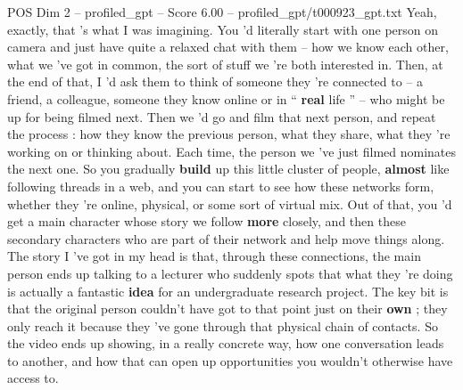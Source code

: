 \begin{textsample}{POS Dim 2 – profiled\_gpt – Score 6.00 – profiled\_gpt/t000923\_gpt.txt}  \label{ex:f2_pos_011}
Yeah, exactly, that ’s what I was imagining.
You ’d literally start with one person on camera and just have quite a relaxed chat with them – how we know each other, what we ’ve got in common, the sort of stuff we ’re both interested in.
Then, at the end of that, I ’d ask them to think of someone they ’re connected to – a friend, a colleague, someone they know online or in “ \textbf{real} life ” – who might be up for being filmed next.
Then we ’d go and film that next person, and repeat the process : how they know the previous person, what they share, what they ’re working on or thinking about.
Each time, the person we ’ve just filmed nominates the next one.
So you gradually \textbf{build} up this little cluster of people, \textbf{almost} like following threads in a web, and you can start to see how these networks form, whether they ’re online, physical, or some sort of virtual mix.
Out of that, you ’d get a main character whose story we follow \textbf{more} closely, and then these secondary characters who are part of their network and help move things along.
The story I ’ve got in my head is that, through these connections, the main person ends up talking to a lecturer who suddenly spots that what they ’re doing is actually a fantastic \textbf{idea} for an undergraduate research project.
The key bit is that the original person couldn't have got to that point just on their \textbf{own} ; they only reach it because they ’ve gone through that physical chain of contacts.
So the video ends up showing, in a really concrete way, how one conversation leads to another, and how that can open up opportunities you wouldn't otherwise have access to.

\end{textsample}
